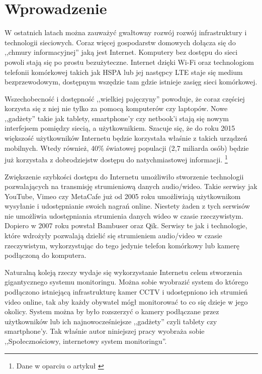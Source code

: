 \chapter{Wprowadzenie}
\label{cha:wprowadzenie}

W ostatnich latach można zauważyć gwałtowny rozwój rozwój infrastruktury i technologii sieciowych. Coraz więcej gospodarstw domowych dołącza się do ,,chmury informacyjnej'' jaką jest Internet. Komputery bez dostępu do sieci powoli stają się po prostu bezużyteczne. Internet dzięki Wi-Fi oraz technologiom telefonii komórkowej takich jak HSPA lub jej następcy LTE staje się medium bezprzewodowym, dostępnym wszędzie tam gdzie istnieje zasięg sieci komórkowej.

Wszechobecność i dostępność ,,wielkiej pajęczyny'' powoduje, że coraz częściej korzysta się z niej nie tylko za pomocą komputerów czy laptopów. Nowe ,,gadżety'' takie jak tablety, smartphone'y czy netbook'i stają się nowym interfejsem pomiędzy siecią, a użytkownikiem. Szacuje się, że do roku 2015 większość użytkowników Internetu będzie korzystała właśnie z takich urządzeń mobilnych. Wtedy również, 40\% światowej populacji (2,7 miliarda osób) będzie już korzystała z dobrodziejstw dostępu do natychmiastowej informacji. \footnote{Dane w oparciu o  artykuł \cite{Kim11}}

Zwiększenie szybkości dostępu do Internetu umożliwiło stworzenie technologii pozwalających na transmisję strumieniową danych audio/wideo. Takie serwisy jak YouTube, Vimeo czy MetaCafe już od 2005 roku umożliwiają użytkownikom wysyłanie i udostępnianie swoich nagrań online. Niestety żaden z tych serwisów nie umożliwia udostępniania strumienia danych wideo w czasie rzeczywistym. Dopiero w 2007 roku powstał Bambuser oraz Qik. Serwisy te jak i technologie, które wdrożyły pozwalają dzielić się strumieniem audio/video w czasie rzeczywistym, wykorzystując do tego jedynie telefon komórkowy lub kamerę podłączoną do komputera.

Naturalną koleją rzeczy wydaje się wykorzystanie Internetu celem stworzenia gigantycznego systemu monitoringu. Można sobie wyobrazić system do którego podłączono istniejącą infrastrukturę kamer CCTV i udostępniono ich strumień video online, tak aby każdy obywatel mógł monitorować to co się dzieje w jego okolicy. System można by było rozszerzyć o kamery podłączane przez użytkowników lub ich najnowocześniejsze ,,gadżety'' czyli tablety czy smartphone'y. Tak właśnie autor niniejszej pracy wyobraża sobie ,,Społecznościowy, internetowy system monitoringu''.

